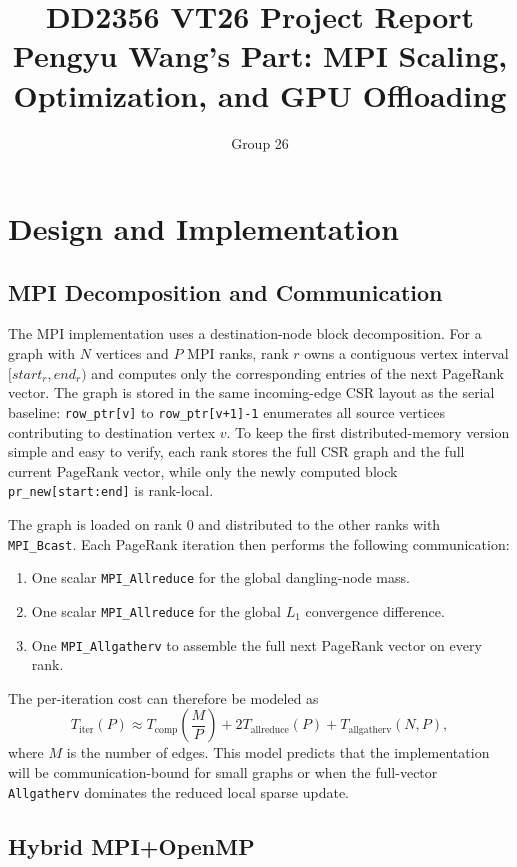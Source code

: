\documentclass[11pt]{article}
\title{DD2356 VT26 Project Report\\Pengyu Wang's Part: MPI Scaling, Optimization, and GPU Offloading}
\author{Group 26}
\date{}
\begin{document}
\maketitle

\section{Design and Implementation}
\label{sec:wang-design}

\subsection{MPI Decomposition and Communication}
\label{subsec:wang-mpi}

The MPI implementation uses a destination-node block decomposition. For a graph
with $N$ vertices and $P$ MPI ranks, rank $r$ owns a contiguous vertex interval
$[start_r,end_r)$ and computes only the corresponding entries of the next
PageRank vector. The graph is stored in the same incoming-edge CSR layout as the
serial baseline: \texttt{row\_ptr[v]} to \texttt{row\_ptr[v+1]-1} enumerates
all source vertices contributing to destination vertex $v$. To keep the first
distributed-memory version simple and easy to verify, each rank stores the full
CSR graph and the full current PageRank vector, while only the newly computed
block \texttt{pr\_new[start:end]} is rank-local.

The graph is loaded on rank 0 and distributed to the other ranks with
\texttt{MPI\_Bcast}. Each PageRank iteration then performs the following
communication:
\begin{enumerate}
    \item One scalar \texttt{MPI\_Allreduce} for the global dangling-node mass.
    \item One scalar \texttt{MPI\_Allreduce} for the global $L_1$ convergence
          difference.
    \item One \texttt{MPI\_Allgatherv} to assemble the full next PageRank vector
          on every rank.
\end{enumerate}
The per-iteration cost can therefore be modeled as
\[
T_{\mathrm{iter}}(P) \approx T_{\mathrm{comp}}\left(\frac{M}{P}\right)
    + 2T_{\mathrm{allreduce}}(P)
    + T_{\mathrm{allgatherv}}(N,P),
\]
where $M$ is the number of edges. This model predicts that the implementation
will be communication-bound for small graphs or when the full-vector
\texttt{Allgatherv} dominates the reduced local sparse update.

\subsection{Hybrid MPI+OpenMP}
\label{subsec:wang-hybrid}
\end{document}
